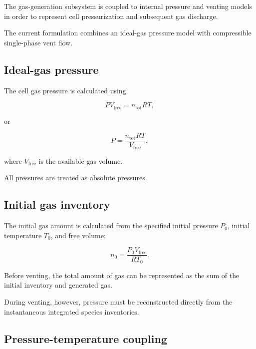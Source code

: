 The gas-generation subsystem is coupled to internal pressure and venting
models in order to represent cell pressurization and subsequent gas
discharge.

The current formulation combines an ideal-gas pressure model with
compressible single-phase vent flow.


\subsection{Ideal-gas pressure}

The cell gas pressure is calculated using

\begin{equation}
    P
    V_{\mathrm{free}}
    =
    n_{\mathrm{tot}}
    R
    T,
\end{equation}

or

\begin{equation}
    P
    =
    \frac{
        n_{\mathrm{tot}}RT
    }{
        V_{\mathrm{free}}
    },
    \label{eq:pressure_ideal}
\end{equation}

where $V_{\mathrm{free}}$ is the available gas volume.

All pressures are treated as absolute pressures.


\subsection{Initial gas inventory}

The initial gas amount is calculated from the specified initial pressure
$P_0$, initial temperature $T_0$, and free volume:

\begin{equation}
    n_0
    =
    \frac{
        P_0 V_{\mathrm{free}}
    }{
        R T_0
    }.
    \label{eq:initial_gas_moles}
\end{equation}

Before venting, the total amount of gas can be represented as the sum of
the initial inventory and generated gas.

During venting, however, pressure must be reconstructed directly from the
instantaneous integrated species inventories.


\subsection{Pressure-temperature coupling}

